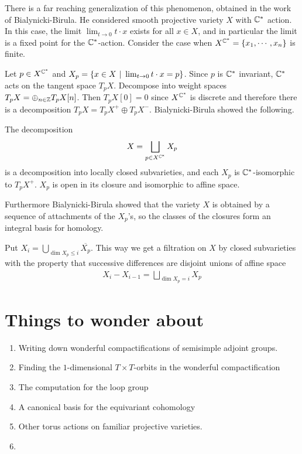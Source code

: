 \documentclass[12pt]{article}
\begin{document}
\hfill

There is a far reaching generalization of this phenomenon, obtained in the work of Bialynicki-Birula. He considered smooth projective
variety $X$ with $\mathbb{C}^*$ action. In this case, the limit $\lim_{t \to 0} t \cdot x$ exists for all $x \in X$, and in particular the limit
is a fixed point for the $\mathbb{C}^*$-action. Consider the case when $X^{\mathbb{C}^*} = \{x_1, \cdots, x_n\}$ is finite.

\hfill

Let $p\in X^{\mathbb{C}^*}$ and $X_p = \{x\in X\ \vert \  \lim_{t\to 0} t\cdot x = p\}$. Since $p$ is $\mathbb{C}^*$ invariant, $\mathbb{C}^*$ acts on the tangent space $T_pX$.
Decompose into weight spaces $T_pX = \oplus_{n\in\mathbb{Z}} T_pX[n]$. Then $T_pX[0] = 0$ since $X^{\mathbb{C}^*}$ is discrete and therefore
there is a decomposition $T_pX =  T_pX^+ \oplus T_pX^-$. Bialynicki-Birula showed the following.

\begin{theorem}
	The decomposition \begin{align*}
		X = \bigsqcup_{p\in X^{\mathbb{C}^*}} X_p
	\end{align*} is a decomposition into locally closed subvarieties, and each $X_p$ is $\mathbb{C}^*$-isomorphic to $T_pX^+$. $X_p$ is
	open in its closure and isomorphic to affine space.
\end{theorem}

Furthermore Bialynicki-Birula showed that the variety $X$ is obtained by a sequence of attachments of the $X_p$'s, so the classes of the
closures form an integral basis for homology.

\hfill

Put $X_i = \bigcup_{\dim X_p\leq i} \overline{X_p}$. This way we get a filtration on $X$ by closed subvarieties with the property that
successive differences are disjoint unions of affine space \begin{align*}
	X_i - X_{i-1} = \bigsqcup_{\dim X_p = i} X_p
\end{align*}

\section{Things to wonder about}
\begin{enumerate}
	\item Writing down wonderful compactifications of semisimple adjoint groups.
	\item Finding the $1$-dimensional $T\times T$-orbits in the wonderful compactification
	\item The computation for the loop group
	\item A canonical basis for the equivariant cohomology
	\item Other torus actions on familiar projective varieties.
	\item
\end{enumerate}
\end{document}
